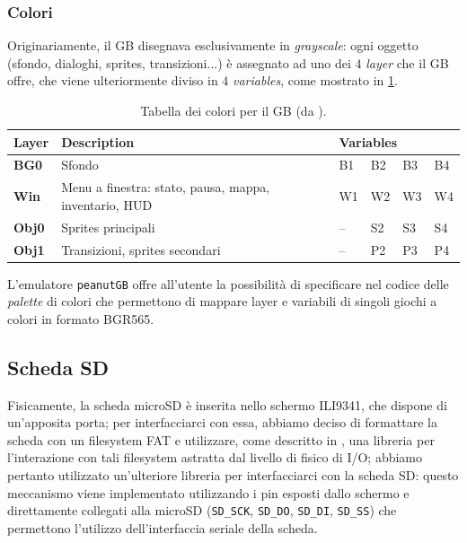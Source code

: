 \documentclass[hidelinks,12pt]{article}
\begin{document}
\subsubsection{Colori}
Originariamente, il GB disegnava esclusivamente in \textit{grayscale}: ogni
oggetto (sfondo, dialoghi, sprites, transizioni...) è assegnato ad uno dei $4$
\textit{layer} che il GB offre, che viene ulteriormente diviso in $4$
\textit{variables}, come mostrato in \cref{table:gb_colors}.
\begin{table}[h]
	\begin{tabular}{|l|l|llll|}
		\hline
		\textbf{Layer} & \textbf{Description}                                  & \multicolumn{4}{l|}{\textbf{Variables}}                                                          \\ \hline
		\textbf{BG0}   & Sfondo                                                & \multicolumn{1}{l|}{B1}                 & \multicolumn{1}{l|}{B2} & \multicolumn{1}{l|}{B3} & B4 \\ \hline
		\textbf{Win}   & Menu a finestra: stato, pausa, mappa, inventario, HUD & \multicolumn{1}{l|}{W1}                 & \multicolumn{1}{l|}{W2} & \multicolumn{1}{l|}{W3} & W4 \\ \hline
		\textbf{Obj0}  & Sprites principali                                    & \multicolumn{1}{l|}{–}                  & \multicolumn{1}{l|}{S2} & \multicolumn{1}{l|}{S3} & S4 \\ \hline
		\textbf{Obj1}  & Transizioni, sprites secondari                        & \multicolumn{1}{l|}{–}                  & \multicolumn{1}{l|}{P2} & \multicolumn{1}{l|}{P3} & P4 \\ \hline
	\end{tabular}
	\caption{Tabella dei colori per il GB (da
		\cite{GameBoyColors}).}
	\label{table:gb_colors}
\end{table}
L'emulatore \texttt{peanutGB} offre all'utente la possibilità di specificare nel
codice delle \textit{palette} di colori che permettono di mappare layer e
variabili di singoli giochi a colori in formato BGR565.

\subsection{Scheda SD}
Fisicamente, la scheda microSD è inserita nello schermo ILI9341, che dispone di
un'apposita porta; per interfacciarci con essa, abbiamo deciso di formattare la
scheda con un filesystem FAT e utilizzare, come descritto in \cite{stm1721}, una
libreria per l'interazione con tali filesystem astratta dal livello di fisico di
I/O; abbiamo pertanto utilizzato un'ulteriore libreria per interfacciarci con
la scheda SD: questo meccanismo viene implementato utilizzando i pin esposti
dallo schermo e direttamente collegati alla microSD (\texttt{SD\_SCK},
\texttt{SD\_DO}, \texttt{SD\_DI}, \texttt{SD\_SS}) che permettono l'utilizzo
dell'interfaccia seriale della scheda.
\end{document}
